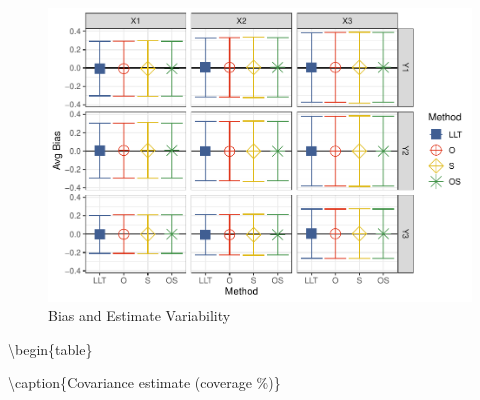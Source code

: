 \documentclass[
]{article}
\begin{document}
\begin{figure}
\centering
\includegraphics{Master_files/figure-latex/unnamed-chunk-22-1.pdf}
\caption{\label{fig:unnamed-chunk-22}Bias and Estimate Variability}
\end{figure}

\textbackslash begin\{table\}

\textbackslash caption\{\label{tab:unnamed-chunk-23}Covariance estimate (coverage \%)\}
\centering
\end{document}
